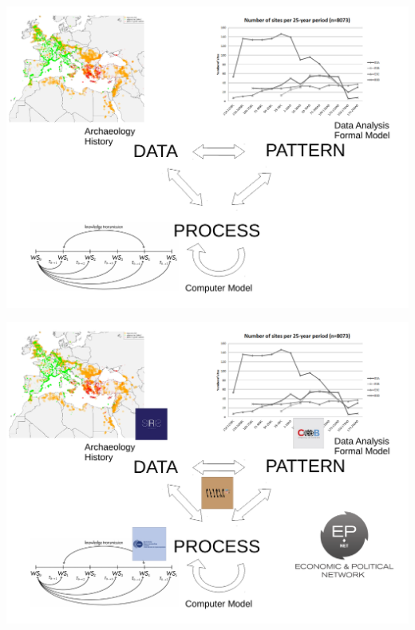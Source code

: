 \documentclass[12pt, notes=show,handout=no]{beamer}
\begin{document}
\begin{frame}
    \begin{center}
	\includegraphics[width=\textwidth]{images/approach.pdf}		
    \end{center}
    
\end{frame}

\begin{frame}
    \begin{center}
	\includegraphics[width=\textwidth]{images/approach2.pdf}		
    \end{center}
    
\end{frame}
\end{document}
